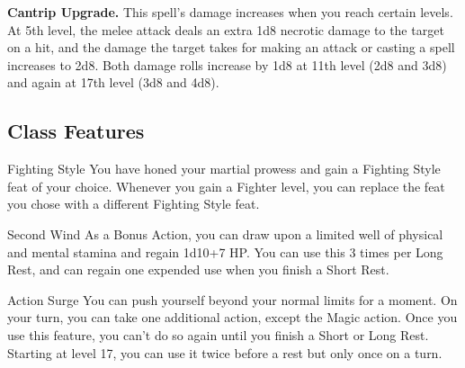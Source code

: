 \textbf{Cantrip Upgrade.} This spell’s damage increases when you reach certain levels. At 5th level, the melee attack deals an extra 1d8 necrotic damage to the target on a hit, and the damage the target takes for making an attack or casting a spell increases to 2d8. Both damage rolls increase by 1d8 at 11th level (2d8 and 3d8) and again at 17th level (3d8 and 4d8).


\subsection {Class Features}
\begingroup
\DndSetThemeColor[PhbMauve]
\begin{DndComment}[]{Fighting Style}
	You have honed your martial prowess and gain a Fighting Style feat of your choice.
	Whenever you gain a Fighter level, you can replace the feat you chose with a different Fighting Style feat.
\end{DndComment}

\begin{DndComment}[]{Second Wind}
	As a Bonus Action, you can draw upon a limited well of physical and mental stamina and regain {1d10+7} HP. 
	You can use this 3 times per Long Rest, and can regain one expended use when you finish a Short Rest.
\end{DndComment}

\begin{DndComment}[]{Action Surge}
	You can push yourself beyond your normal limits for a moment. On your turn, you can take one additional action, except the Magic action.
	Once you use this feature, you can’t do so again until you finish a Short or Long Rest. 
	Starting at level 17, you can use it twice before a rest but only once on a turn.
\end{DndComment}

